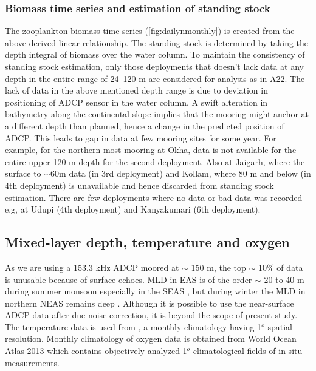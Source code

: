 \documentclass{article}
\begin{document}
	\subsubsection{Biomass time series and estimation of standing stock}
	
	The zooplankton biomass time series (\cref{fig:dailynmonthly}) is created from the above derived linear relationship. The standing stock is determined by taking the depth integral of biomass over the water column. To maintain the consistency of standing stock estimation, only those deployments that doesn't lack data at any depth in the entire range of 24--120 m are considered for analysis as in A22. The lack of data in the above mentioned depth range is due to deviation in positioning of ADCP sensor in the water column. A swift alteration in bathymetry along the continental slope implies that the mooring might anchor at a different depth than planned, hence a change in the predicted position of ADCP. This leads to gap in data at few mooring sites for some year. For example, for the northern-most mooring at Okha, data is not available for the entire upper 120 m depth for the second deployment. Also at Jaigarh, where the surface to $\sim$60m data (in 3rd deployment) and Kollam, where 80 m and below (in 4th deployment) is unavailable and hence discarded from standing stock estimation. There are few deployments where no data or bad data was recorded e.g, at Udupi (4th deployment) and Kanyakumari (6th deployment).  	
	
	\subsection{Mixed-layer depth, temperature and oxygen}
	As we are using a 153.3 kHz ADCP moored at $\sim$ 150 m, the top $\sim$ 10\% of data is unusable because of surface echoes. MLD in EAS is of the order $\sim$ 20 to 40 m during summer monsoon \citep{shetye1990hydrography,shankar2005hydrography,sreenivas2008monthly} especially in the SEAS \citep{shenoi2005hydrography}, but during winter the MLD in northern NEAS remains deep \citep{shankar2016inhibition}. Although it is possible to use the near-surface ADCP data after due noise correction, it is beyond the scope of present study. The temperature data is used from \citet{chatterjee2012new}, a monthly climatology having 1$^o$ spatial resolution. Monthly climatology of oxygen data is obtained from World Ocean Atlas 2013 \citep{garcia2013oxygen} which contains objectively analyzed 1$^o$ climatological fields of in situ measurements. 
	
\end{document}
